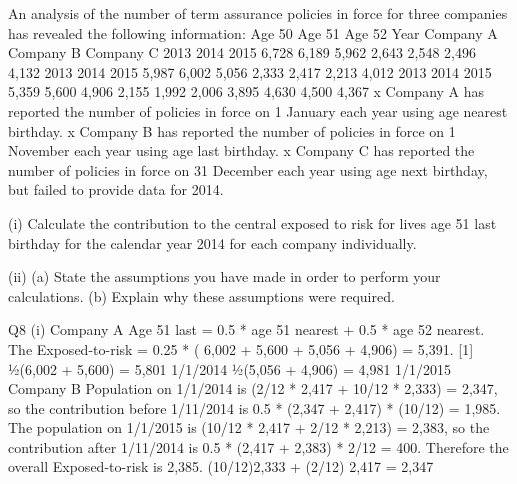 \documentclass[a4paper,12pt]{article}
\begin{document}
An analysis of the number of term assurance policies in force for three companies has
revealed the following information:
Age 50
Age 51
Age 52
Year Company A Company B Company C
2013
2014
2015 6,728
6,189
5,962 2,643
2,548
2,496 4,132
2013
2014
2015 5,987
6,002
5,056 2,333
2,417
2,213 4,012
2013
2014
2015 5,359
5,600
4,906 2,155
1,992
2,006 3,895
4,630
4,500
4,367
x Company A has reported the number of policies in force on 1 January each year
using age nearest birthday.
x Company B has reported the number of policies in force on 1 November each year
using age last birthday.
x Company C has reported the number of policies in force on 31 December each
year using age next birthday, but failed to provide data for 2014.
\begin{enumrate}[(a)]
\ite (i) Calculate the contribution to the central exposed to risk for lives age 51 last
birthday for the calendar year 2014 for each company individually.
\item (ii) (a)
State the assumptions you have made in order to perform
your calculations.
(b)
Explain why these assumptions were required.
\end{enumrate}
\newpage 
Q8
(i)
Company A
Age 51 last = 0.5 * age 51 nearest + 0.5 * age 52 nearest. 
The Exposed-to-risk = 0.25 * ( 6,002 + 5,600 + 5,056 + 4,906) = 5,391. [1]
1⁄2(6,002 + 5,600)
= 5,801
1/1/2014
1⁄2(5,056 + 4,906)
= 4,981
1/1/2015
Company B
Population on 1/1/2014 is (2/12 * 2,417 + 10/12 * 2,333) = 2,347, 
so the contribution before 1/11/2014 is 0.5 * (2,347 + 2,417) * (10/12) = 1,985. 
The population on 1/1/2015 is (10/12 * 2,417 + 2/12 * 2,213) = 2,383, 
so the contribution after 1/11/2014 is 0.5 * (2,417 + 2,383) * 2/12 = 400. 
Therefore the overall Exposed-to-risk is 2,385.
(10/12)2,333 + (2/12) 2,417
= 2,347
\end{document}
